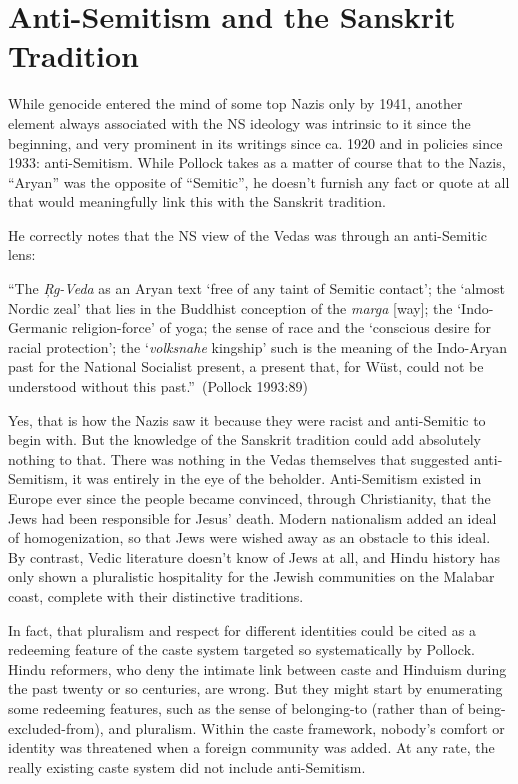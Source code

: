 \section*{Anti-Semitism and the Sanskrit Tradition}

While genocide entered the mind of some top Nazis only by 1941, another element always associated with the NS ideology was intrinsic to it since the beginning, and very prominent in its writings since ca. 1920 and in policies since 1933: anti-Semitism. While Pollock takes as a matter of course that to the Nazis, “Aryan” was the opposite of “Semitic”, he doesn’t furnish any fact or quote at all that would meaningfully link this with the Sanskrit tradition.

He correctly notes that the NS view of the Vedas was through an anti-Semitic lens: 
\begin{myquote}
“The {\sl Ŗg-Veda} as an Aryan text ‘free of any taint of Semitic contact’; the ‘almost Nordic zeal’ that lies in the Buddhist conception of the {\sl marga} [way]; the ‘Indo-Germanic religion-force’ of yoga; the sense of race and the ‘conscious desire for racial protection’; the ‘{\sl volksnahe} kingship’ such is the meaning of the Indo-Aryan past for the National Socialist present, a present that, for Wüst, could not be understood without this past.”~\hfill(Pollock 1993:89)
\end{myquote}

Yes, that is how the Nazis saw it because they were racist and anti-Semitic to begin with. But the knowledge of the Sanskrit tradition could add absolutely nothing to that. There was nothing in the Vedas themselves that suggested anti-Semitism, it was entirely in the eye of the beholder. Anti-Semitism existed in Europe ever since the people became convinced, through Christianity, that the Jews had been responsible for Jesus’ death. Modern nationalism added an ideal of homogenization, so that Jews were wished away as an obstacle to this ideal. By contrast, Vedic literature doesn’t know of Jews at all, and Hindu history has only shown a pluralistic hospitality for the Jewish communities on the Malabar coast, complete with their distinctive traditions.

In fact, that pluralism and respect for different identities could be cited as a redeeming feature of the caste system targeted so systematically by Pollock. Hindu reformers, who deny the intimate link between caste and Hinduism during the past twenty or so centuries, are wrong. But they might start by enumerating some redeeming features, such as the sense of belonging-to (rather than of being-excluded-from), and pluralism. Within the caste framework, nobody’s comfort or identity was threatened when a foreign community was added. At any rate, the really existing caste system did not include anti-Semitism.

